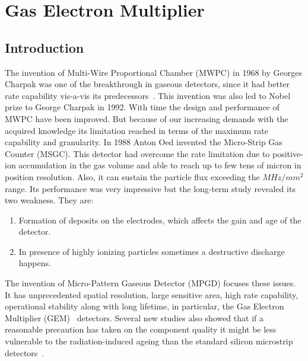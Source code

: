 \chapter{Gas Electron Multiplier} %
\label{cha:gas_electron_multiplier}

\section{Introduction} %
\label{sec:introduction}
The invention of Multi-Wire Proportional Chamber (MWPC) in 1968 by Georges Charpak was one of the breakthrough in gaseous detectors, since it had better rate capability vis-a-vis its predecessors~\cite{Charpak1968}. 
This invention was also led to Nobel prize to George Charpak in 1992. With time the design and performance of MWPC have been improved. But because of our increasing demands with the acquired knowledge its limitation reached in terms of the maximum rate capability and granularity. In 1988 Anton Oed invented the Micro-Strip Gas Counter (MSGC). 
This detector had overcome the rate limitation due to positive-ion accumulation in the gas volume and able to reach up to few tens of micron in position resolution. 
Also, it can sustain the particle flux exceeding the $MHz/mm^2$ range. Its performance was very impressive but the long-term study revealed its two weakness. They are:
\begin{enumerate}
	\item Formation of deposits on the electrodes, which affects the gain and age of the detector.
	\item In presence of highly ionizing particles sometimes a destructive discharge happens.
\end{enumerate}
The invention of Micro-Pattern Gaseous Detector (MPGD) focuses these issues. 
It has unprecedented spatial resolution, large sensitive area, high rate capability, operational stability along with long lifetime, in particular, the Gas Electron Multiplier (GEM)~\cite{Sauli1997,Sauli1999,detector:1732870} detectors. 
Several new studies also showed that if a reasonable precaution has taken on the component quality it might be less vulnerable to the radiation-induced ageing than the standard silicon microstrip detectors~\cite{TITOV2004,Titov2002}.


